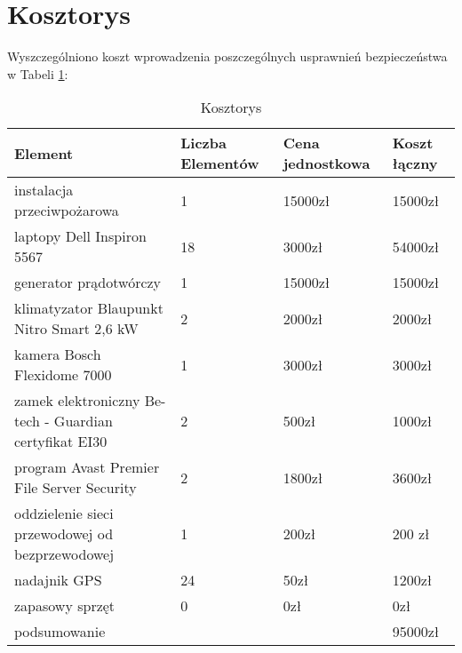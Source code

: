 \newpage
\section{Kosztorys}
Wyszczególniono koszt wprowadzenia poszczególnych usprawnień bezpieczeństwa w Tabeli \ref{kosztorys}:
\begin{longtable}[ht!]{|m{4cm}|m{3cm}|m{3cm}|m{3cm}|}
	\caption{Kosztorys}
	\label{kosztorys} \\
	\hline	
	\textbf{Element} & \textbf{Liczba \linebreak Elementów} & \textbf{Cena \linebreak jednostkowa} & \textbf{Koszt łączny} \\ \hline
	instalacja \linebreak przeciwpożarowa & 1 & 15000zł & 15000zł \\ \hline
	laptopy Dell Inspiron 5567 & 18 & 3000zł & 54000zł \\ \hline
	generator \linebreak prądotwórczy & 1 & 15000zł & 15000zł \\ \hline
	klimatyzator \linebreak Blaupunkt Nitro Smart 2,6 kW & 2 & 2000zł & 2000zł \\ \hline
	kamera Bosch \linebreak Flexidome 7000 & 1 & 3000zł & 3000zł \\ \hline
	zamek elektroniczny Be-tech - Guardian certyfikat EI30 & 2 & 500zł & 1000zł \\ \hline
	program Avast \linebreak Premier File Server Security & 2 & 1800zł & 3600zł \\ \hline
	oddzielenie sieci \linebreak przewodowej od bezprzewodowej & 1 & 200zł & 200 zł \\ \hline
	nadajnik GPS & 24 & 50zł & 1200zł \\ \hline
	zapasowy sprzęt & 0 & 0zł & 0zł \\ \hline
	podsumowanie & & & 95000zł \\ \hline
\end{longtable}